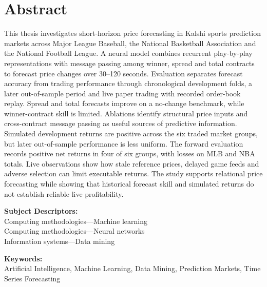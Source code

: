 \documentclass[12pt,a4paper,oneside]{report}
\begin{document}
\pagestyle{plain}
\setcounter{page}{1}

\chapter*{Abstract}
\singlespacing
This thesis investigates short-horizon price forecasting in Kalshi sports
prediction markets across Major League Baseball, the National Basketball
Association and the National Football League. A neural model combines
recurrent play-by-play representations with message passing among winner,
spread and total contracts to forecast price changes over 30--120 seconds.
Evaluation separates forecast accuracy from trading performance through
chronological development folds, a later out-of-sample period and live paper trading with
recorded order-book replay. Spread and total forecasts improve on a no-change
benchmark, while winner-contract skill is limited. Ablations
identify structural price inputs and cross-contract message passing as useful
sources of predictive information. Simulated development returns are positive across the six traded
market groups, but later out-of-sample performance is less uniform. The forward
evaluation records positive net returns in four of six groups, with losses on
MLB and NBA totals. Live observations show how stale reference prices, delayed
game feeds and adverse selection can limit executable returns. The
study supports relational price forecasting while showing that
historical forecast skill and simulated returns do not establish reliable
live profitability.

\vspace{0.6em}
\noindent\textbf{Subject Descriptors:}\\[2pt]
\hspace*{1.2cm}Computing methodologies---Machine learning\\
\hspace*{1.2cm}Computing methodologies---Neural networks\\
\hspace*{1.2cm}Information systems---Data mining

\vspace{0.6em}
\noindent\textbf{Keywords:}\\[2pt]
\hspace*{1.2cm}Artificial Intelligence, Machine Learning, Data Mining, Prediction Markets,
Time Series Forecasting
\end{document}
